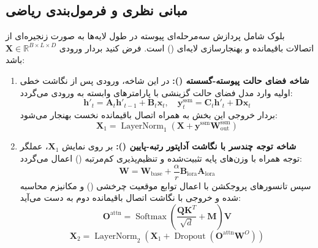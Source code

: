 \subsection{مبانی نظری و فرمول‌بندی ریاضی}
بلوک  شامل پردازش سه‌مرحله‌ای پیوسته در طول لایه‌ها به صورت زنجیره‌ای از اتصالات باقیمانده و بهنجارسازی لایه‌ای () است. فرض کنید بردار ورودی $\mathbf{X} \in \mathbb{R}^{B \times L \times D}$ باشد:

\begin{enumerate}
    \item \textbf{شاخه فضای حالت پیوسته-گسسته ():}
    در این شاخه، ورودی پس از نگاشت خطی اولیه وارد مدل فضای حالت گزینشی با پارامترهای وابسته به ورودی می‌گردد:
    \begin{equation}
    \mathbf{h}'_t = \mathbf{A}_t \mathbf{h}'_{t-1} + \mathbf{B}_t \mathbf{x}_t, \quad \mathbf{y}_t^{\text{ssm}} = \mathbf{C}_t \mathbf{h}'_t + \mathbf{D} \mathbf{x}_t
    \end{equation}
    بردار خروجی این بخش به همراه اتصال باقیمانده نخست بهنجار می‌شود:
    \begin{equation}
    \mathbf{X}_1 = \operatorname{LayerNorm}_1\left(\mathbf{X} + \mathbf{y}^{\text{ssm}} \mathbf{W}_{\text{out}}^{\text{ssm}}\right)
    \end{equation}

    \item \textbf{شاخه توجه چندسر با نگاشت آداپتور رتبه-پایین ():}
    بر روی نمایش $\mathbf{X}_1$، عملگر توجه همراه با وزن‌های پایه تثبیت‌شده و تنظیم‌پذیری کم‌مرتبه () اعمال می‌گردد:
    \begin{equation}
    \mathbf{W} = \mathbf{W}_{\text{base}} + \frac{\alpha}{r} \mathbf{B}_{\text{lora}} \mathbf{A}_{\text{lora}}
    \end{equation}
    سپس تانسورهای پروجکشن با اعمال توابع موقعیت چرخشی () و مکانیزم  محاسبه شده و خروجی با نگاشت اتصال باقیمانده دوم به دست می‌آید:
    \begin{equation}
    \mathbf{O}^{\text{attn}} = \operatorname{Softmax}\left(\frac{\mathbf{Q} \mathbf{K}^T}{\sqrt{d}} + \mathbf{M}\right)\mathbf{V}
    \end{equation}
    \begin{equation}
    \mathbf{X}_2 = \operatorname{LayerNorm}_2\left(\mathbf{X}_1 + \operatorname{Dropout}\left(\mathbf{O}^{\text{attn}} \mathbf{W}^O\right)\right)
    \end{equation}


\end{enumerate}
